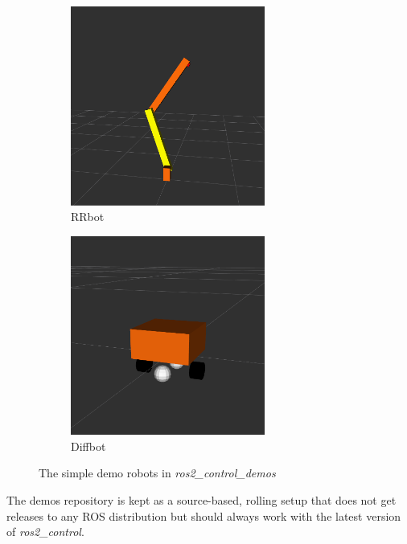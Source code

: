 \documentclass[journal]{IEEEtran}
\begin{document}
\begin{figure}[]
	\centering
	\begin{subfigure}{0.45\columnwidth}
	    \centering
		\includegraphics[width=0.7\textwidth]{figures/rrbot2}
		\caption{RRbot}
		\label{fig:rrbot}
	\end{subfigure}
	\begin{subfigure}{0.45\columnwidth}
	    \centering
		\includegraphics[width=0.7\textwidth]{figures/diffbot}
		\caption{Diffbot}
		\label{fig:diffbot}
	\end{subfigure}
	\caption{The simple demo robots in \emph{ros2\_control\_demos}}
	\label{fig:demo_robots}
\end{figure}

The demos repository is kept as a source-based, rolling setup that does not get releases to any ROS distribution but should always work with the latest version of \emph{ros2\_control}.
\end{document}
